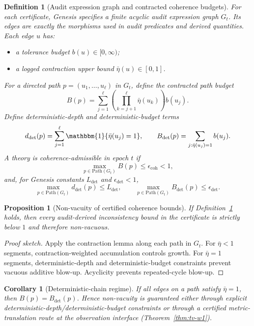 \documentclass[11pt,a4paper]{article}
\newtheorem{proposition}[theorem]{Proposition}
\newtheorem{corollary}[theorem]{Corollary}
\newtheorem{definition}{Definition}[section]
\begin{document}
\begin{definition}[Audit expression graph and contracted coherence budgets]
\label{def:cohbudget}
For each certificate, Genesis specifies a finite \emph{acyclic audit expression graph} $G_t$.
Its edges are exactly the morphisms used in audit predicates and derived quantities.
Each edge $u$ has:
\begin{itemize}[leftmargin=*]
\item a tolerance budget $b(u)\in[0,\infty)$;
\item a logged contraction upper bound $\bar\eta(u)\in[0,1]$.
\end{itemize}

For a directed path $p=(u_1,\dots,u_\ell)$ in $G_t$, define the contracted path budget
\[
B(p)=\sum_{j=1}^{\ell}\left(\prod_{k=j+1}^{\ell}\bar\eta(u_k)\right)b(u_j).
\]
Define deterministic-depth and deterministic-budget terms
\[
d_{\det}(p)=\sum_{j=1}^{\ell}\mathbbm{1}\{\bar\eta(u_j)=1\},
\qquad
B_{\det}(p)=\sum_{j:\bar\eta(u_j)=1} b(u_j).
\]
A theory is coherence-admissible in epoch $t$ if
\[
\max_{p\in\mathrm{Path}(G_t)}B(p)\le \epsilon_{\mathrm{coh}}<1,
\]
and, for Genesis constants $L_{\det}$ and $\epsilon_{\det}<1$,
\[
\max_{p\in\mathrm{Path}(G_t)}d_{\det}(p)\le L_{\det},
\qquad
\max_{p\in\mathrm{Path}(G_t)}B_{\det}(p)\le \epsilon_{\det}.
\]
\end{definition}

\begin{proposition}[Non-vacuity of certified coherence bounds]
If Definition~\ref{def:cohbudget} holds, then every audit-derived inconsistency bound in the certificate is strictly below $1$ and therefore non-vacuous.
\end{proposition}
\begin{proof}[Proof sketch]
Apply the contraction lemma along each path in $G_t$.
For $\bar\eta<1$ segments, contraction-weighted accumulation controls growth.
For $\bar\eta=1$ segments, deterministic-depth and deterministic-budget constraints prevent vacuous additive blow-up.
Acyclicity prevents repeated-cycle blow-up.
\end{proof}

\begin{corollary}[Deterministic-chain regime]
If all edges on a path satisfy $\bar\eta=1$, then $B(p)=B_{\det}(p)$.
Hence non-vacuity is guaranteed either through explicit deterministic-depth/deterministic-budget constraints or through a certified metric-translation route at the observation interface (Theorem~\ref{thm:tv-w1}).
\end{corollary}
\end{document}
